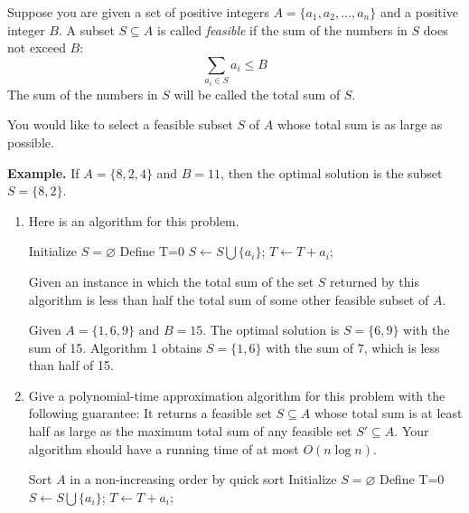 \begin{problem}
  Suppose you are given a set of positive integers $A=\{a_1,a_2,...,a_n\}$ and a positive integer $B$. A subset $S\subseteq A$ is called \emph{feasible} if the sum of the numbers in $S$ does not exceed $B$:
  \begin{equation}
  \sum_{a_i\in S}a_i \leq B
  \end{equation}
  The sum of the numbers in $S$ will be called the total sum of $ S$.
  
  You would like to select a feasible subset $S$ of $A$ whose total sum is as large as possible.
  
  \textbf{Example.} If $A=\{8,2,4\}$ and $B=11$, then the optimal solution is the subset $S=\{8,2\}$.
  \begin{enumerate}
  
  \item Here is an algorithm for this problem.
  
  \begin{algorithm} [H]
  \caption{}
          \begin{algorithmic}
               \State Initialize $S=\varnothing$
               \State Define T=0
                       \State  $S\leftarrow S\bigcup\{a_i\}$;
                       \State $T\leftarrow T+a_i$;
                    \EndIf
               \EndFor
          \end{algorithmic}
  \end{algorithm}
  
  Given an instance in which the total sum of the set $S$ returned by this algorithm is less than half the total sum of some other feasible subset of $A$.
  
  \Answer 
  Given $A=\{1,6,9\}$ and $B=15$. The optimal solution is $S=\{6,9\}$ with the sum of 15. Algorithm 1 obtains $S=\{1,6\}$ with the sum of 7, which is less than half of 15.
  
  \item Give a polynomial-time approximation algorithm for this problem with the following guarantee: It returns a feasible set $S\subseteq A$ whose total sum is at least half as large as the maximum total sum of any feasible set $S'\subseteq A$. Your algorithm should have a running time of at most $O(n\log n)$.
   
  \Answer   
  \begin{algorithm}[H]
  \caption{}
  \begin{small}
          \begin{algorithmic}[1]
          \State Sort $A$ in a non-increasing order by quick sort 
               \State Initialize $S=\varnothing$
               \State Define T=0
                       \State  $S\leftarrow S\bigcup\{a_i\}$; 
                       \State $T\leftarrow T+a_i$; 
                    \EndIf
               \EndFor
          \end{algorithmic}
  \end{small}
  \end{algorithm}
  

\end{enumerate}
\end{problem}
